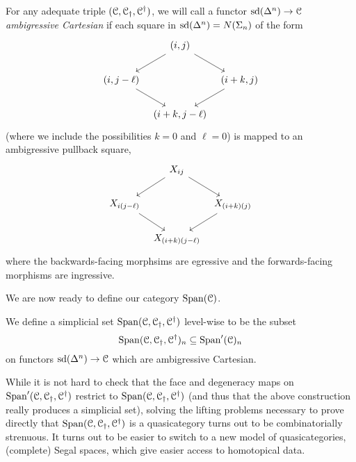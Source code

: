 \documentclass[main.tex]{subfiles}
\begin{document}

\begin{definition}
  \label{def:ambigressive_cartesian}
  For any adequate triple $(\mathcal{C}, \mathcal{C}_{\dagger}, \mathcal{C}^{\dagger})$, we will call a functor $\mathrm{sd}(\Delta^{n}) \to \mathcal{C}$ \emph{ambigressive Cartesian} if each square in $\mathrm{sd}(\Delta^{n}) = N(\Sigma_{n})$ of the form
  \begin{equation*}
    \begin{tikzcd}[column sep=tiny]
      & {(i, j)}
      \arrow[dr]
      \arrow[dl]
      \\
      {(i, j - \ell)}
      \arrow[dr]
      & & {(i + k , j)}
      \arrow[dl]
      \\
      & {(i + k , j - \ell)}
    \end{tikzcd}
  \end{equation*}
  (where we include the possibilities $k = 0$ and $\ell = 0$) is mapped to an ambigressive pullback square,
  \begin{equation*}
    \begin{tikzcd}[column sep=tiny]
      & X_{ij}
      \arrow[dr]
      \arrow[dl]
      \\
      X_{i(j-\ell)}
      \arrow[dr]
      & & X_{(i+k)(j)}
      \arrow[dl]
      \\
      & X_{(i+k)(j-\ell)}
    \end{tikzcd}
  \end{equation*}
  where the backwards-facing morphsims are egressive and the forwards-facing morphisms are ingressive. 
\end{definition}

We are now ready to define our category $\mathrm{Span}(\mathcal{C})$.

\begin{definition}
  We define a simplicial set $\mathrm{Span}(\mathcal{C}, \mathcal{C}_{\dagger}, \mathcal{C}^{\dagger})$ level-wise to be the subset
  \begin{equation*}
    \mathrm{Span}(\mathcal{C}, \mathcal{C}_{\dagger}, \mathcal{C}^{\dagger})_{n} \subseteq \mathrm{Span}'(\mathcal{C})_{n}
  \end{equation*}
  on functors $\mathrm{sd}(\Delta^{n}) \to \mathcal{C}$ which are ambigressive Cartesian.
\end{definition}

While it is not hard to check that the face and degeneracy maps on $\mathrm{Span}'(\mathcal{C}, \mathcal{C}_{\dagger}, \mathcal{C}^{\dagger})$ restrict to $\mathrm{Span}(\mathcal{C}, \mathcal{C}_{\dagger}, \mathcal{C}^{\dagger})$ (and thus that the above construction really produces a simplicial set), solving the lifting problems necessary to prove directly that $\mathrm{Span}(\mathcal{C}, \mathcal{C}_{\dagger}, \mathcal{C}^{\dagger})$ is a quasicategory turns out to be combinatorially strenuous. It turns out to be easier to switch to a new model of quasicategories, (complete) Segal spaces, which give easier access to homotopical data.
\end{document}
